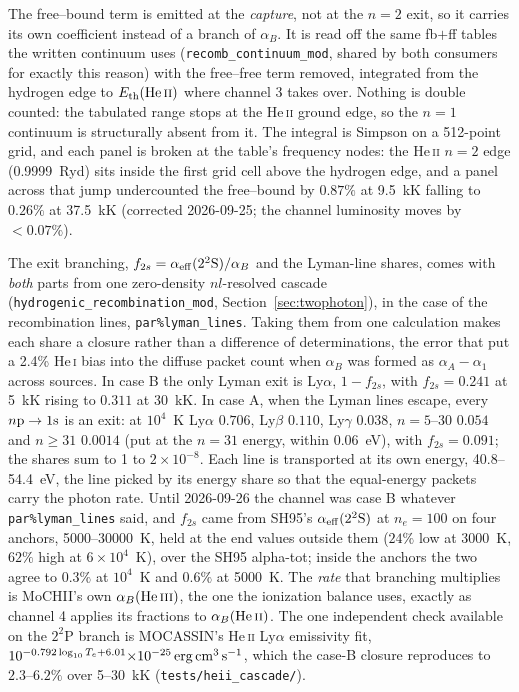 \documentclass[english,a4paper]{my_memo}
\newcommand{\code}[1]{\texttt{#1}}
\begin{document}
The free--bound term is emitted at the \emph{capture}, not at the $n=2$
exit, so it carries its own coefficient instead of a branch of $\alpha_B$.
It is read off the same fb$+$ff tables the written continuum uses
(\code{recomb\_continuum\_mod}, shared by both consumers for exactly this
reason) with the free--free term removed, integrated from the hydrogen edge
to $E_{\rm th}({\rm He\,\textsc{ii}})$ where channel 3 takes over.  Nothing
is double counted: the tabulated range stops at the He\,\textsc{ii} ground
edge, so the $n=1$ continuum is structurally absent from it.  The
integral is Simpson on a 512-point grid, and each panel is broken at the
table's frequency nodes: the He\,\textsc{ii} $n=2$ edge (0.9999~Ryd) sits
inside the first grid cell above the hydrogen edge, and a panel across that
jump undercounted the free--bound by $0.87\%$ at 9.5~kK falling to $0.26\%$
at 37.5~kK (corrected 2026-09-25; the channel luminosity moves by
${<}0.07\%$).

The exit branching, $f_{2s} = \alpha_{\rm eff}(2^2{\rm S})/\alpha_B$ and the
Lyman-line shares, comes with \emph{both} parts from one zero-density
$nl$-resolved cascade (\code{hydrogenic\_recombination\_mod},
Section~\ref{sec:twophoton}), in the case of the recombination lines,
\code{par\%lyman\_lines}.  Taking them from one calculation makes each share
a closure rather than a difference of determinations, the error that put a
2.4\% He\,\textsc{i} bias into the diffuse packet count when $\alpha_B$ was
formed as $\alpha_A - \alpha_1$ across sources.  In case B the only Lyman
exit is Ly$\alpha$, $1 - f_{2s}$, with $f_{2s} = 0.241$ at 5~kK rising to
$0.311$ at 30~kK.  In case A, when the Lyman lines escape, every
$n{\rm p}\rightarrow1{\rm s}$ is an exit: at $10^4$~K Ly$\alpha$ $0.706$,
Ly$\beta$ $0.110$, Ly$\gamma$ $0.038$, $n = 5$--30 $0.054$ and $n\ge31$
$0.0014$ (put at the $n=31$ energy, within 0.06~eV), with $f_{2s} = 0.091$;
the shares sum to 1 to $2{\times}10^{-8}$.  Each line is transported at its
own energy, 40.8--54.4~eV, the line picked by its energy share so that the
equal-energy packets carry the photon rate.  Until 2026-09-26 the channel
was case B whatever \code{par\%lyman\_lines} said, and $f_{2s}$ came from
SH95's $\alpha_{\rm eff}(2^2{\rm S})$ at $n_e=100$ on four anchors,
5000--30000~K, held at the end values outside them ($24\%$ low at 3000~K,
$62\%$ high at $6{\times}10^4$~K), over the SH95 alpha-tot; inside the
anchors the two agree to $0.3\%$ at $10^4$~K and $0.6\%$ at 5000~K.  The \emph{rate} that branching multiplies is
MoCHII's own $\alpha_B({\rm He\,\textsc{iii}})$, the one the ionization
balance uses, exactly as channel 4 applies its fractions to
$\alpha_B({\rm He\,\textsc{ii}})$.  The one independent check available on
the $2^2$P branch is MOCASSIN's He\,\textsc{ii} Ly$\alpha$ emissivity fit,
$10^{-0.792\log_{10}T_e + 6.01}{\times}10^{-25}\,{\rm erg\,cm^3\,s^{-1}}$,
which the case-B closure reproduces to $2.3$--$6.2\%$ over 5--30~kK
(\code{tests/heii\_cascade/}).
\end{document}
